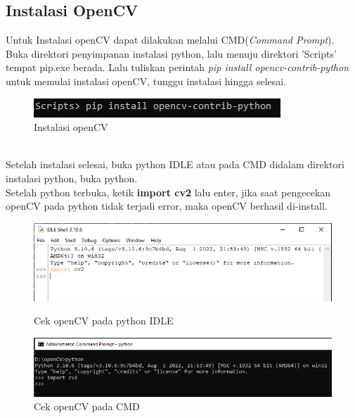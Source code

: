\subsection{Instalasi OpenCV}
Untuk Instalasi openCV dapat dilakukan melalui CMD(\emph{Command Prompt}). Buka direktori penyimpanan instalasi python, lalu menuju direktori 'Scripts' tempat pip.exe berada. Lalu tuliskan perintah \emph{pip install opencv-contrib-python} untuk memulai instalasi openCV, tunggu instalasi hingga selesai.
\begin{figure}[h!]
    \centering
    \includegraphics[width=0.7\linewidth]{images/opencv_1.PNG}
    \caption{Instalasi openCV}
\end{figure}
\\Setelah instalasi selesai, buka python IDLE atau pada CMD didalam direktori instalasi python, buka python.\\

Setelah python terbuka, ketik \textbf{import cv2} lalu enter, jika saat pengecekan openCV pada python tidak terjadi error, maka openCV berhasil di-install.
\begin{figure}[h!]
    \centering
    \includegraphics[width=1\linewidth]{images/opencv_2.PNG}
    \caption{Cek openCV pada python IDLE}
    \includegraphics[width=1\linewidth]{images/opencv_3.PNG}
    \caption{Cek openCV pada CMD}
\end{figure}